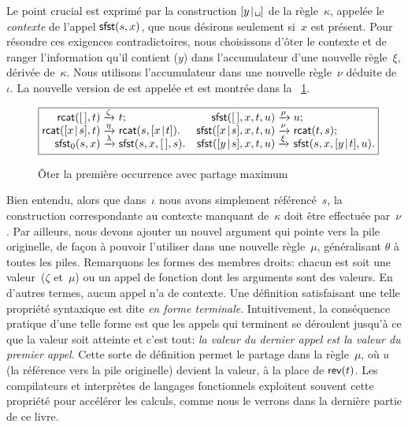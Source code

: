 Le point crucial est exprimé par la construction
\(\cons{y}{\texttt{\textvisiblespace}}\) de la règle~\(\kappa\),
appelée le \emph{contexte}
de l'appel \(\textsf{sfst}(s,x)\), que nous
désirons seulement si~\(x\) est présent. Pour résoudre ces exigences
contradictoires, nous choisissons d'ôter le contexte et de ranger
l'information qu'il contient (\(y\)) dans l'accumulateur d'une nouvelle règle~\(\xi\), dérivée
de~\(\kappa\). Nous utilisons l'accumulateur dans une nouvelle
règle~\(\nu\) déduite de~\(\iota\). La nouvelle version de
 est appelée
 et est montrée dans
la \fig~\ref{fig:sfst0}.
\begin{figure}[b]
\begin{equation*}
\boxed{%
\begin{array}{@{}r@{\;}l@{\;}lr@{\;}l@{\;}l@{}}
  \fun{rcat}(\el,t)              & \xrightarrow{\smash{\zeta}} & t; &
  \fun{sfst}(\el,x,t,u)          & \xrightarrow{\smash{\mu}} & u;\\
  \fun{rcat}(\cons{x}{s},t)      & \xrightarrow{\smash{\eta}}
                               & \fun{rcat}(s,\cons{x}{t}). &
\fun{sfst}(\cons{x}{s},x,t,u)  & \xrightarrow{\smash{\nu}}
                               & \fun{rcat}(t,s);\\
\fun{sfst}_0(s,x)              & \xrightarrow{\smash{\lambda}}
                               & \fun{sfst}(s,x,\el,s). &
\fun{sfst}(\cons{y}{s},x,t,u)  & \xrightarrow{\smash{\xi}}
                               & \fun{sfst}(s,x,\cons{y}{t},u).
\end{array}}
\end{equation*}
\caption{Ôter la première occurrence avec partage maximum}
\label{fig:sfst0}
\end{figure}

Bien entendu, alors que dans~\(\iota\) nous avons simplement
référencé~\(s\), la construction correspondante au contexte manquant
de~\(\kappa\) doit être effectuée par~\(\nu\). Par ailleurs, nous
devons ajouter un nouvel argument qui pointe vers la pile originelle,
de façon à pouvoir l'utiliser dans une nouvelle règle~\(\mu\),
généralisant \(\theta\) à toutes les piles. Remarquons les formes des
membres droits: chacun est soit une valeur~(\(\zeta\) et~\(\mu\)) ou
un appel de fonction dont les arguments sont des valeurs. En d'autres
termes, aucun appel n'a de contexte. Une définition satisfaisant une
telle propriété syntaxique est dite \emph{en forme
  terminale}. Intuitivement, la conséquence pratique d'une telle forme
est que les appels qui terminent se déroulent jusqu'à ce que la valeur
soit atteinte et c'est tout: \emph{la valeur du dernier appel est la
  valeur du premier appel}. Cette sorte de définition permet le
partage dans la règle~\(\mu\), où \(u\) (la référence vers la pile
originelle) devient la valeur, à la place de \(\textsf{rev}(t)\). Les
compilateurs et interprètes de langages fonctionnels exploitent
souvent cette propriété pour accélérer les calculs, comme nous le
verrons dans la dernière partie de ce livre.

